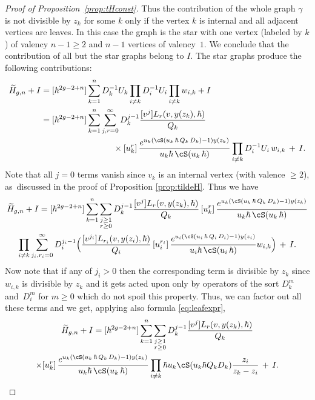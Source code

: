 \begin{proof}[Proof of Proposition~\ref{prop:tHconst}]
Thus the contribution of the whole graph $\gamma$ is not divisible by $z_k$ for some $k$ only if the vertex $k$ is internal and all adjacent vertices are leaves. In this case the graph is the star with one vertex (labeled by $k$) of valency $n-1\geq 2$ and $n-1$ vertices of valency~$1$. We conclude that the contribution of all but the star graphs belong to $I$. The star graphs produce the following contributions:
\begin{align*}
\widetilde{H}_{g,n}+I &=[\hbar^{2g-2+n}]\sum\limits_{k=1}^n D_k^{-1} U_k\prod_{i\ne k} D_i^{-1}U_i\prod_{i\ne k}w_{i,k}+I\\
&=[\hbar^{2g-2+n}]\sum\limits_{k=1}^n \sum_{j,r=0}^\infty D_k^{j-1}\frac{[v^j]L_r(v,y(z_k),\hbar)}{Q_k}\\
&\hspace*{3cm}\times[u_k^r]\, \frac{e^{u_k(\cS(u_k\,\hbar\,Q_k\,D_k)-1)y(z_k)}}{u_k\hbar\,\cS(u_k\,\hbar)}\prod_{i\ne k} D_i^{-1}U_i\,w_{i,k}\,+\,I.
\end{align*}
Note that all $j=0$ terms vanish since $v_k$ is an internal vertex (with valence $\geq 2$), as~discussed in the proof of Proposition \ref{prop:tildeH}. Thus we have
\begin{multline*}
\widetilde{H}_{g,n}+I =[\hbar^{2g-2+n}]\sum\limits_{k=1}^n \sum_{\substack{j\geq 1 \\ r \geq 0}} D_k^{j-1}\frac{[v^j]L_r(v,y(z_k),\hbar)}{Q_k}
\,[u_k^r]\, \frac{e^{u_k(\cS(u_k\,\hbar\,Q_k\,D_k)-1)y(z_k)}}{u_k\hbar\,\cS(u_k\,\hbar)}
\\
\prod_{i\ne k} \sum_{j_i,r_i=0}^\infty D_i^{j_i-1}\Bigl(\frac{[v^{j_i}]L_{r_i}(v,y(z_i),\hbar)}{Q_i}
\,[u_i^{r_i}]\, \frac{e^{u_i(\cS(u_i\,\hbar\,Q_i\,D_i)-1)y(z_i)}}{u_i\hbar\,\cS(u_i\,\hbar)}w_{i,k} \Bigr)\,+\,I.
\end{multline*}
Now note that if any of $j_i>0$ then the corresponding term is divisible by $z_k$ since $w_{i,k}$ is divisible by $z_k$ and it gets acted upon only by operators of the sort $D_k^m$ and~$D_i^m$ for $m\geq 0$ which do not spoil this property. Thus, we can factor out all these terms and we get, applying also formula \eqref{eq:leafexpr},
\begin{multline} \label{eq:HtildeI}
\widetilde{H}_{g,n}+I
=[\hbar^{2g-2+n}]\sum\limits_{k=1}^n \sum_{\substack{j\geq 1 \\ r \geq 0}} D_k^{j-1}\frac{[v^j]L_r(v,y(z_k),\hbar)}{Q_k}
\\
\times[u_k^r]\, \frac{e^{u_k(\cS(u_k\,\hbar\,Q_k\,D_k)-1)y(z_k)}}{u_k\hbar\,\cS(u_k\,\hbar)}
\prod_{i\ne k}
\hbar u_k \cS(u_k\hbar Q_kD_k)\frac{z_i}{z_k-z_i}\,+\,I.

\end{multline}
\end{proof}
